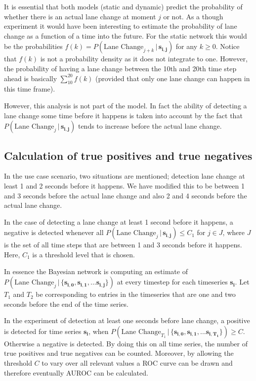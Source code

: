 \documentclass{article}
\theoremstyle{theorem}
\theoremstyle{definition}
\newcommand{\bu}[1]{\mathbf{#1}}
\newcommand{\bv}[1]{\bm{#1}}
\begin{document}
It is essential that both models (static and dynamic) predict the probability of whether there is an actual lane change at moment $j$ or not.  As a though experiment it would have been interesting to estimate the probability of lane change as a function of a time into the future.  For the static network this would be the probabilities $f(k) = P(\mbox{Lane Change}_{j+ k} \,|\,  \bv{s_{i,j}})$ for any $k \geq 0$. Notice that $f(k)$ is not a probability density as it does not integrate to one.  However, the probability of having a lane change between the 10th and 20th time step ahead is basically $\sum_{10}^{20}f(k)$ (provided that only one lane change can happen in this time frame).  

However, this analysis is not part of the model.  In fact the ability of detecting a lane change some time before it happens is taken into account by the fact that $P(\mbox{Lane Change}_j \,|\,  \bv{s_{i,j}})$ tends to increase before the actual lane change.

\subsection*{Calculation of true positives and true negatives}

In the use case scenario, two situations are mentioned; detection lane change at least 1 and 2 seconds before it happens.  We have modified this to be between 1 and 3 seconds before the actual lane change and also 2 and 4 seconds before the actual lane change.

In the case of detecting a lane change at least 1 second before it happens, a negative is detected whenever all $P(\mbox{Lane Change}_j \,|\,  \bv{s_{i,j}})  \leq C_1$ for $j  \in J$, where $J$ is the set of all time steps that are between 1 and 3 seconds before it happens.  Here, $C_1$ is a threshold level that is chosen.  


In essence the Bayesian network is computing an estimate of $P(\mbox{Lane Change}_j \,|\, \{ \bv{s_{i,0}}, \bv{s_{i,1}}, ... \bv{s_{i,j}} \})$ at every timestep for each timeseries $\bu{s_i}$.  Let $T_1$ and $T_2$ be corresponding to entries in the timeseries that are one and two seconds before the end of the time series.   

In the experiment of detection at least one seconds before lane change, a positive is detected for time series $\bu{s_i}$, when  $P(\mbox{Lane Change}_{T_1} \,|\, \{ \bv{s_{i,0}}, \bv{s_{i,1}}, ... \bv{s_{i,T_1}} \}) \geq C$.  Otherwise a negative is detected.  By doing this on all time series, the number of true positives and true negatives can be counted. Moreover, by allowing the threshold $C$ to vary over all relevant values a ROC curve can be drawn and therefore eventually AUROC can be calculated.
\end{document}
